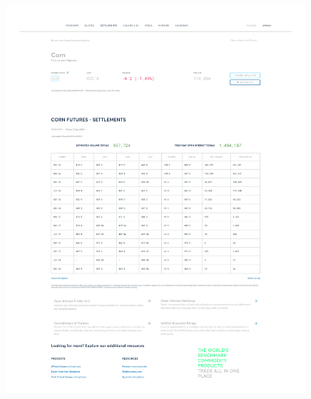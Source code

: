 \documentclass[11pt,a4paper]{article} %
\begin{document}
\begin{figure}[h]
  \centering
  \includegraphics[width=0.99\textwidth]{appendix/CORN12SEP.pdf}
  \label{fig:corn_settlements}
\end{figure}
\end{document}
